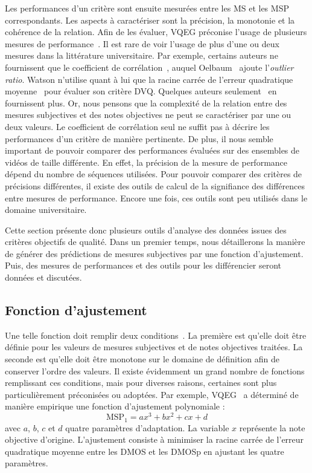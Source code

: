Les performances d'un critère sont ensuite mesurées entre les MS et les MSP correspondants. Les aspects à caractériser sont la précision, la monotonie et la cohérence de la relation. Afin de les évaluer, VQEG préconise l'usage de plusieurs mesures de performance~\cite{vqeg-MMtestplan}. Il est rare de voir l'usage de plus d'une ou deux mesures dans la littérature universitaire. Par exemple, certains auteurs ne fournissent que le coefficient de corrélation~\cite{eskicioglu-icassp2000,wang-icip2002,ebrahimi-spie2004,crete-phd}, auquel Oelbaum~\cite{oelbaum-pcs2007} ajoute l'\emph{outlier ratio}. Watson n'utilise quant à lui que la racine carrée de l'erreur quadratique moyenne~\cite{watson-dvq} pour évaluer son critère DVQ. Quelques auteurs seulement~\cite{chen-icassp2006,chandler-vsnr} en fournissent plus. Or, nous pensons que la complexité de la relation entre des mesures subjectives et des notes objectives ne peut se caractériser par une ou deux valeurs. Le coefficient de corrélation seul ne suffit pas à décrire les performances d'un critère de manière pertinente. De plus, il nous semble important de pouvoir comparer des performances évaluées sur des ensembles de vidéos de taille différente. En effet, la précision de la mesure de performance dépend du nombre de séquences utilisées. Pour pouvoir comparer des critères de précisions différentes, il existe des outils de calcul de la signifiance des différences entre mesures de performance. Encore une fois, ces outils sont peu utilisés dans le domaine universitaire.

Cette section présente donc plusieurs outils d'analyse des données issues des critères objectifs de qualité. Dans un premier temps, nous détaillerons la manière de générer des prédictions de mesures subjectives par une fonction d'ajustement. Puis, des mesures de performances et des outils pour les différencier seront données et discutées.


\subsection{Fonction d'ajustement}
Une telle fonction doit remplir deux conditions~\cite{brill-spic}. La première est qu'elle doit être définie pour les valeurs de mesures subjectives et de notes objectives traitées. La seconde est qu'elle doit être monotone sur le domaine de définition afin de conserver l'ordre des valeurs. Il existe évidemment un grand nombre de fonctions remplissant ces conditions, mais pour diverses raisons, certaines sont plus particulièrement préconisées ou adoptées. Par exemple, VQEG~\cite{vqeg-MMtestplan} a déterminé de manière empirique une fonction d'ajustement polynomiale :
\begin{equation}
\text{MSP}_1 = a x^3 + b x^2 + c x + d
\end{equation}
%
avec $a$, $b$, $c$ et $d$ quatre paramètres d'adaptation. La variable $x$ représente la note objective d'origine. L'ajustement consiste à minimiser la racine carrée de l'erreur quadratique moyenne entre les DMOS et les DMOSp en ajustant les quatre paramètres.

